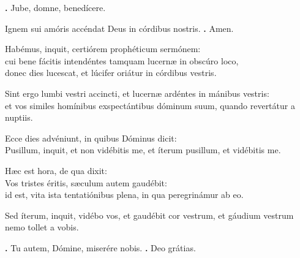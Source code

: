 \begin{small}
\textbf{\Vbar.} Jube, domne, benedícere.

Ignem sui amóris accéndat Deus in córdibus nostris. \textbf{\Rbar.} Amen.
\end{small}


Habémus, inquit, certiórem prophéticum sermónem: \\
cui bene fácitis intendéntes tamquam lucernæ in obscúro loco, \\
donec dies lucescat, et lúcifer oriátur in córdibus vestris. 

Sint ergo lumbi vestri accincti, et lucernæ ardéntes in mánibus vestris: \\
et vos similes homínibus exspectántibus dóminum suum, quando revertátur a nuptiis. 

Ecce dies advéniunt, in quibus Dóminus dicit: \\
Pusillum, inquit, et non vidébitis me, et íterum pusillum, et vidébitis me. 

Hæc est hora, de qua dixit: \\
Vos tristes éritis, sæculum autem gaudébit: \\
id est, vita ista tentatiónibus plena, in qua peregrinámur ab eo. 

Sed íterum, inquit, vidébo vos, et gaudébit cor vestrum, et gáudium vestrum nemo tollet a vobis.

\textbf{\Vbar.} Tu autem, Dómine, miserére nobis.
\textbf{\Rbar.} Deo grátias.

